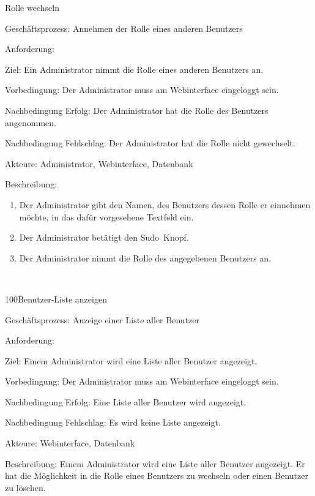 \begin{function}{90}{Rolle wechseln}
\item[Geschäftsprozess:] Annehmen der Rolle eines anderen Benutzers
\item[Anforderung:] 
\item[Ziel:] Ein Administrator nimmt die Rolle eines anderen Benutzers an.
\item[Vorbedingung:] Der Administrator muss am Webinterface eingeloggt sein.
\item[Nachbedingung Erfolg:] Der Administrator hat die Rolle des Benutzers angenommen.
\item[Nachbedingung Fehlschlag:] Der Administrator hat die Rolle nicht gewechselt.
\item[Akteure:] Administrator, Webinterface, Datenbank
\item[Beschreibung:] ~
\begin{enumerate}
\item Der Administrator gibt den Namen, des Benutzers dessen Rolle er einnehmen möchte, in das dafür vorgesehene Textfeld ein.
\item Der Administrator betätigt den \glqq Sudo\grqq\ Knopf.
\item Der Administrator nimmt die Rolle des angegebenen Benutzers an.
\end{enumerate}
\end{function} ~

\begin{function}{100}{Benutzer-Liste anzeigen}
\item[Geschäftsprozess:] Anzeige einer Liste aller Benutzer
\item[Anforderung:] 
\item[Ziel:] Einem Administrator wird eine Liste aller Benutzer angezeigt.
\item[Vorbedingung:] Der Administrator muss am Webinterface eingeloggt sein.
\item[Nachbedingung Erfolg:] Eine Liste aller Benutzer wird angezeigt.
\item[Nachbedingung Fehlschlag:] Es wird keine Liste angezeigt.
\item[Akteure:] Webinterface, Datenbank
\item[Beschreibung:] Einem Administrator wird eine Liste aller Benutzer angezeigt. Er hat die Möglichkeit in die Rolle eines Benutzers zu wechseln oder einen Benutzer zu löschen.
\end{function} ~

